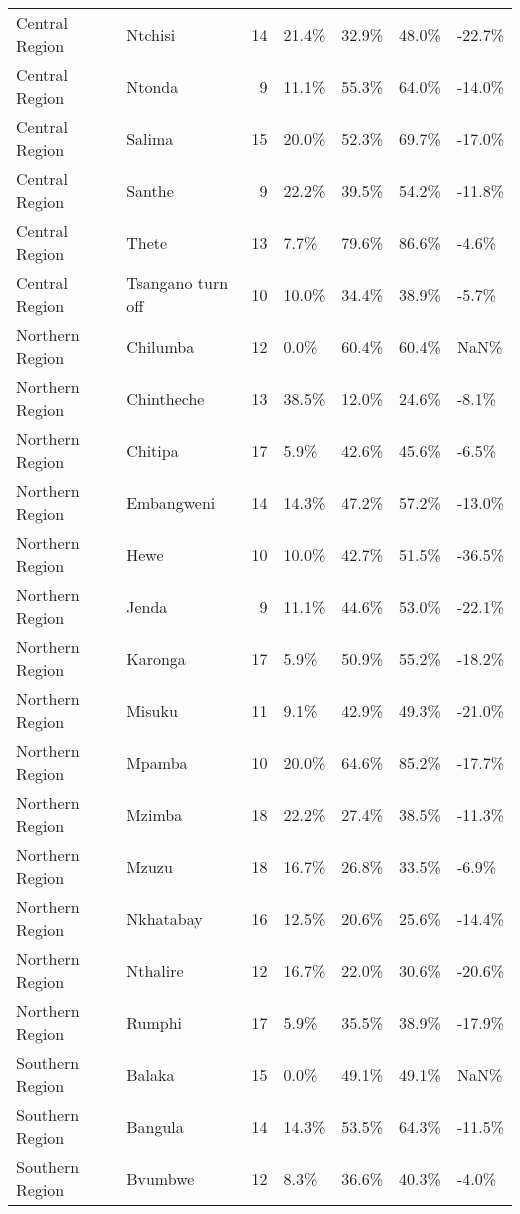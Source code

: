 \begin{table}[ht]
\begin{tabular}{llrllll}
  Central Region & Ntchisi &  14 & 21.4\% & 32.9\% & 48.0\% & -22.7\% \\ 
  Central Region & Ntonda &   9 & 11.1\% & 55.3\% & 64.0\% & -14.0\% \\ 
  Central Region & Salima &  15 & 20.0\% & 52.3\% & 69.7\% & -17.0\% \\ 
  Central Region & Santhe &   9 & 22.2\% & 39.5\% & 54.2\% & -11.8\% \\ 
  Central Region & Thete &  13 & 7.7\% & 79.6\% & 86.6\% & -4.6\% \\ 
  Central Region & Tsangano turn off &  10 & 10.0\% & 34.4\% & 38.9\% & -5.7\% \\ 
  Northern Region & Chilumba &  12 & 0.0\% & 60.4\% & 60.4\% & NaN\% \\ 
  Northern Region & Chintheche &  13 & 38.5\% & 12.0\% & 24.6\% & -8.1\% \\ 
  Northern Region & Chitipa &  17 & 5.9\% & 42.6\% & 45.6\% & -6.5\% \\ 
  Northern Region & Embangweni &  14 & 14.3\% & 47.2\% & 57.2\% & -13.0\% \\ 
  Northern Region & Hewe &  10 & 10.0\% & 42.7\% & 51.5\% & -36.5\% \\ 
  Northern Region & Jenda &   9 & 11.1\% & 44.6\% & 53.0\% & -22.1\% \\ 
  Northern Region & Karonga &  17 & 5.9\% & 50.9\% & 55.2\% & -18.2\% \\ 
  Northern Region & Misuku &  11 & 9.1\% & 42.9\% & 49.3\% & -21.0\% \\ 
  Northern Region & Mpamba &  10 & 20.0\% & 64.6\% & 85.2\% & -17.7\% \\ 
  Northern Region & Mzimba &  18 & 22.2\% & 27.4\% & 38.5\% & -11.3\% \\ 
  Northern Region & Mzuzu &  18 & 16.7\% & 26.8\% & 33.5\% & -6.9\% \\ 
  Northern Region & Nkhatabay &  16 & 12.5\% & 20.6\% & 25.6\% & -14.4\% \\ 
  Northern Region & Nthalire &  12 & 16.7\% & 22.0\% & 30.6\% & -20.6\% \\ 
  Northern Region & Rumphi &  17 & 5.9\% & 35.5\% & 38.9\% & -17.9\% \\ 
  Southern Region & Balaka &  15 & 0.0\% & 49.1\% & 49.1\% & NaN\% \\ 
  Southern Region & Bangula &  14 & 14.3\% & 53.5\% & 64.3\% & -11.5\% \\ 
  Southern Region & Bvumbwe &  12 & 8.3\% & 36.6\% & 40.3\% & -4.0\% \\ 

\end{tabular}
\end{table}
